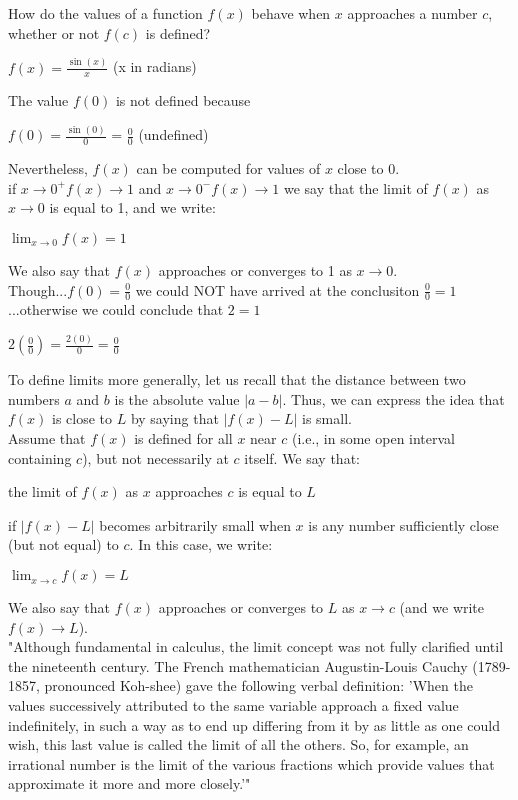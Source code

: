 \documentclass{article}
\begin{document}
\noindent How do the values of a function $f(x)$ behave when $x$ approaches a number $c$, whether or not $f(c)$ is defined?\\

\begin{center}$f(x) = \frac{\sin(x)}{x}$ (x in radians)\end{center}
The value $f(0)$ is not defined because
\begin{center}$f(0) = \frac{\sin(0)}{0}$ = $\frac{0}{0}$ (undefined)\end{center}
Nevertheless, $f(x)$ can be computed for values of $x$ close to 0.\\

if $x \to 0^+ f(x) \to 1$ and $x \to 0^- f(x) \to 1$ we say that the limit of $f(x)$ as $x \to 0$ is equal to 1, and we write:
\begin{center}$\lim_{x \to 0}f(x) = 1$\end{center}
We also say that $f(x)$ approaches or converges to 1 as $x \to 0$.\\

\noindent Though...$f(0) = \frac{0}{0}$ we could NOT have arrived at the conclusiton $\frac{0}{0} = 1$...otherwise we could conclude that $2=1$
\begin{center}$2(\frac{0}{0}) = \frac{2(0)}{0} = \frac{0}{0}$\end{center}

To define limits more generally, let us recall that the distance between two numbers $a$ and $b$ is the absolute value $\left|a-b\right|$. Thus, we can express the idea that $f(x)$ is close to $L$ by saying that $\left|f(x) - L\right|$ is small.\\

Assume that $f(x)$ is defined for all $x$ near $c$ (i.e., in some open interval containing $c$), but not necessarily at $c$ itself. We say that:
\begin{center}the limit of $f(x)$ as $x$ approaches $c$ is equal to $L$\end{center}
if $\left|f(x) - L\right|$ becomes arbitrarily small when $x$ is any number sufficiently close (but not equal) to $c$. In this case, we write:
\begin{center}$\lim_{x \to c}f(x) = L$\end{center}
We also say that $f(x)$ approaches or converges to $L$ as $x \to c$ (and we write $f(x) \to L$).\\

"Although fundamental in calculus, the limit concept was not fully clarified until the nineteenth century. The French mathematician Augustin-Louis Cauchy (1789-1857, pronounced Koh-shee) gave the following verbal definition: 'When the values successively attributed to the same variable approach a fixed value indefinitely, in such a way as to end up differing from it by as little as one could wish, this last value is called the limit of all the others. So, for example, an irrational number is the limit of the various fractions which provide values that approximate it more and more closely.'"\\
\end{document}
